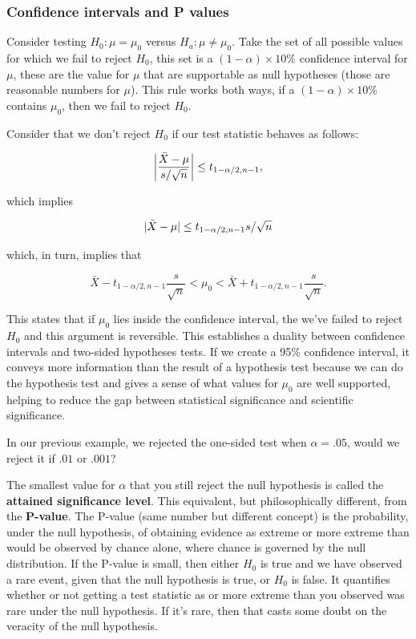 \documentclass{homework}
\begin{document}
\subsubsection{Confidence intervals and P values}

Consider testing $H_0 : \mu = \mu_0$ versus $H_a : \mu \neq \mu_0$. Take the set of all possible values for which we fail to reject $H_0$, this set is a $(1-\alpha)\times 10\%$ confidence interval for $\mu$, these are the value for $\mu$ that are supportable as null hypotheses (those are reasonable numbers for $\mu$). This rule works both ways, if a $(1-\alpha)\times 10\%$ contains $\mu_0$, then we fail to reject $H_0$.

Consider that we don't reject $H_0$ if our test statistic behaves as follows:

$$
\bigg|\frac{\Bar{X}-\mu}{s/\sqrt{n}}\bigg| \leq t_{1-\alpha/2, n-1},
$$

which implies 

$$
|\Bar{X}-\mu| \leq t_{1-\alpha/2, n-1} s/\sqrt{n}
$$

which, in turn, implies that 

$$
\bar{X} - t_{1-\alpha/2, n-1} \frac{s}{\sqrt{n}} < \mu_0 < \bar{X} + t_{1-\alpha/2, n-1} \frac{s}{\sqrt{n}}.
$$

This states that if $\mu_0$ lies inside the confidence interval, the we've failed to reject $H_0$ and this argument is reversible. This establishes a duality between confidence intervals and two-sided hypotheses tests. If we create a 95\% confidence interval, it conveys more information than the result of a hypothesis test because we can do the hypothesis test and gives a sense of what values for $\mu_0$ are well supported, helping to reduce the gap between statistical significance and scientific significance. 

In our previous example, we rejected the one-sided test when $\alpha = .05$, would we reject it if $.01$ or $.001$?

The smallest value for $\alpha$ that you still reject the null hypothesis is called the \textbf{attained significance level}. This equivalent, but philosophically different, from the \textbf{P-value}.
The P-value (same number but different concept) is the probability, under the null hypothesis, of obtaining evidence as extreme or more extreme than would be observed by chance alone, where chance is governed by the null distribution. If the P-value is small, then either $H_0$ is true and we have observed a rare event, given that the null hypothesis is true, or $H_0$ is false. It quantifies whether or not getting a test statistic as or more extreme than you observed was rare under the null hypothesis. If it's rare, then that casts some doubt on the veracity of the null hypothesis. \\ 
\end{document}
